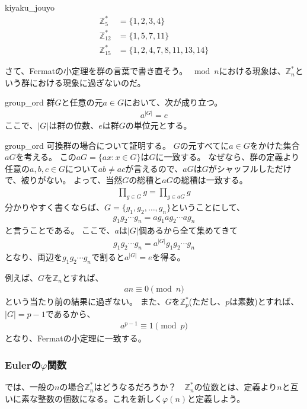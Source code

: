 \begin{Exam}{}{kiyaku_jouyo}
\begin{align*}
\mathbb{Z}^*_5 &= \{1, 2, 3, 4\}\\
\mathbb{Z}^*_{12} &= \{1, 5, 7, 11\}\\
\mathbb{Z}^*_{15} &= \{1,2,4,7,8,11,13,14\}
\end{align*}
\end{Exam}

さて、Fermatの小定理を群の言葉で書き直そう。
$\bmod{n}$における現象は、$\mathbb{Z}_n^*$という群における現象に過ぎないのだ。

\begin{Theo}{}{group_ord}
群$G$と任意の元$a\in G$において、次が成り立つ。
\begin{align*}
a^{|G|} = e
\end{align*}
ここで、$|G|$は群の位数、$e$は群$G$の単位元とする。
\end{Theo}

\begin{thProof}{group_ord}
可換群の場合について証明する。
$G$の元すべてに$a\in{G}$をかけた集合$aG$を考える。
この$aG=\{ax:x\in{G}\}$は$G$に一致する。
なぜなら、群の定義より任意の$a,b,c\in{G}$について$ab\neq{ac}$が言えるので、$aG$は$G$がシャッフルしただけで、被りがない。
よって、当然$G$の総積と$aG$の総積は一致する。
\begin{align*}
\prod_{g\in{G}}g = \prod_{g\in{aG}}g
\end{align*}
分かりやすく書くならば、$G=\{g_1,g_2,\ldots,g_n\}$ということにして、
\begin{align*}
g_1g_2\cdots g_n = ag_1 ag_2 \cdots ag_n
\end{align*}
と言うことである。
ここで、$a$は$|G|$個あるから全て集めてきて
\begin{align*}
g_1g_2\cdots g_n = a^{|G|}g_1 g_2 \cdots g_n
\end{align*}
となり、両辺を$g_1g_2\cdots{g_n}$で割ると$a^{|G|}=e$を得る。
\end{thProof}

例えば、$G$を$\mathbb{Z}_n$とすれば、
\begin{align*}
an \equiv 0 \pmod{n}
\end{align*}
という当たり前の結果に過ぎない。
また、$G$を$\mathbb{Z}^*_p$(ただし、$p$は素数)とすれば、$|G|=p-1$であるから、
\begin{align*}
a^{p-1} \equiv 1 \pmod{p}
\end{align*}
となり、Fermatの小定理に一致する。

\subsubsection{Eulerの$\varphi$関数}
では、一般の$n$の場合$\mathbb{Z}^*_n$はどうなるだろうか？　$\mathbb{Z}^*_n$の位数とは、定義より$n$と互いに素な整数の個数になる。これを新しく$\varphi(n)$と定義しよう。


